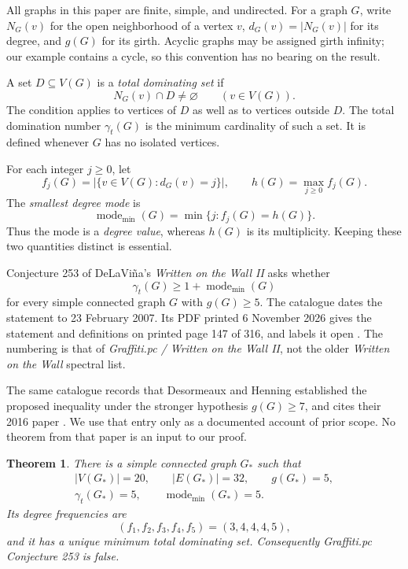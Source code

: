 \documentclass[11pt,a4paper]{article}
\newtheorem{theorem}{Theorem}[section]
\theoremstyle{definition}
\theoremstyle{remark}
\newcommand{\gt}{\gamma_t}
\newcommand{\mmin}{\operatorname{mode}_{\min}}
\newcommand{\Gstar}{G_{\ast}}
\begin{document}
All graphs in this paper are finite, simple, and undirected.
For a graph $G$, write $N_G(v)$ for the open neighborhood of a vertex
$v$, $d_G(v)=|N_G(v)|$ for its degree, and $g(G)$ for its girth.
Acyclic graphs may be assigned girth infinity; our example contains
a cycle, so this convention has no bearing on the result.

A set $D\subseteq V(G)$ is a \emph{total dominating set} if
\[
        N_G(v)\cap D\ne\varnothing\qquad(v\in V(G)).
\]
The condition applies to vertices of $D$ as well as to vertices outside
$D$. The total domination number $\gt(G)$ is the minimum cardinality
of such a set. It is defined whenever $G$ has no isolated vertices.

For each integer $j\ge0$, let
\[
        f_j(G)=|\{v\in V(G):d_G(v)=j\}|,\qquad
        h(G)=\max_{j\ge0}f_j(G).
\]
The \emph{smallest degree mode} is
\[
        \mmin(G)=\min\{j:f_j(G)=h(G)\}.
\]
Thus the mode is a \emph{degree value}, whereas $h(G)$ is its
multiplicity. Keeping these two quantities distinct is essential.

Conjecture 253 of DeLaVi\~na's \emph{Written on the Wall II}
asks whether
\begin{equation}\label{eq:original}
       \gt(G)\ge1+\mmin(G)
\end{equation}
for every simple connected graph $G$ with $g(G)\ge5$.
The catalogue dates the statement to 23 February 2007. Its PDF printed
6 November 2026 gives the statement and
definitions on printed page 147 of 316, and labels it open
\cite[p.~147]{wowii}. The numbering is that of
\emph{Graffiti.pc / Written on the Wall II}, not the older
\emph{Written on the Wall} spectral list.

The same catalogue records that Desormeaux and Henning established
the proposed inequality under the stronger hypothesis $g(G)\ge7$,
and cites their 2016 paper \cite{DH}. We use that entry only as a
documented account of prior scope. No theorem from that paper is an
input to our proof.

\begin{theorem}\label{thm:main}
There is a simple connected graph $\Gstar$ such that
\[
\begin{gathered}
       |V(\Gstar)|=20,\qquad |E(\Gstar)|=32,\qquad g(\Gstar)=5,\\
       \gt(\Gstar)=5,\qquad \mmin(\Gstar)=5.
\end{gathered}
\]
Its degree frequencies are
\[
       (f_1,f_2,f_3,f_4,f_5)=(3,4,4,4,5),
\]
and it has a unique minimum total dominating set.
Consequently Graffiti.pc Conjecture 253 is false.
\end{theorem}
\end{document}
